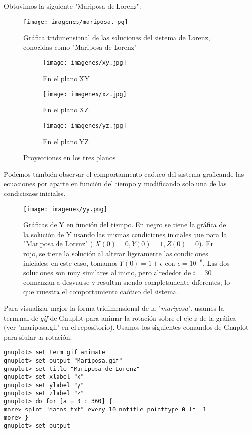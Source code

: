 \documentclass[letterpaper, 12pt]{article}
\begin{document}
{Obtuvimos la siguiente "Mariposa de Lorenz":
\clearpage

\begin{figure} [!htbp]
\centering
\texttt{[image: imagenes/mariposa.jpg]}
\caption{Gr\'afica tridimensional de las soluciones del sistema de Lorenz, conocidas como "Mariposa de Lorenz"}

\begin{subfigure}{0.31\textwidth}
\texttt{[image: imagenes/xy.jpg]}
\caption{En el plano XY}
\end{subfigure}
\begin{subfigure}{0.31\textwidth}
\texttt{[image: imagenes/xz.jpg]}
\caption{En el plano XZ}
\end{subfigure}
\begin{subfigure}{0.31\textwidth}
\texttt{[image: imagenes/yz.jpg]}
\caption{En el plano YZ}
\end{subfigure}
\caption{Proyecciones en los tres planos}
\end{figure}


Podemos tambi\'en observar el comportamiento ca\'otico del sistema graficando las ecuaciones por aparte en funci\'on del tiempo y modificando solo una de las condiciones iniciales. 
\clearpage

\begin{figure} [t]
\centering
\texttt{[image: imagenes/yy.png]}
\caption{Gr\'aficas de Y en funci\'on del tiempo. En negro se tiene la gr\'afica de la soluci\'on de Y usando las mismas condiciones iniciales que para la "Mariposa de Lorenz" ( $X(0) = 0, Y(0) = 1, Z(0) = 0$). En rojo, se tiene la soluci\'on al alterar ligeramente las condiciones iniciales: en este caso, tomamos $Y(0) = 1 + \epsilon$ con $\epsilon = 10^{-6}$. Las dos soluciones son muy similares al inicio, pero alrededor de $t = 30$ comienzan a desviarse y resultan siendo completamente diferentes, lo que muestra el comportamiento ca\'otico del sistema.}
\end{figure}


\justify
Para visualizar mejor la forma tridimensional de la "\textit{mariposa}", usamos la terminal de \textit{gif} de Gnuplot para animar la rotaci\'on sobre el eje $z$ de la gr\'afica (ver "mariposa.gif" en el repositorio). Usamos los siguientes comandos de Gnuplot para siular la rotaci\'on:

\begin{lstlisting}
gnuplot> set term gif animate
gnuplot> set output "Mariposa.gif"
gnuplot> set title "Mariposa de Lorenz"
gnuplot> set xlabel "x"
gnuplot> set ylabel "y"
gnuplot> set zlabel "z"
gnuplot> do for [a = 0 : 360] {
more> splot "datos.txt" every 10 notitle pointtype 0 lt -1
more> }
gnuplot> set output
\end{lstlisting}


}
\end{document}

